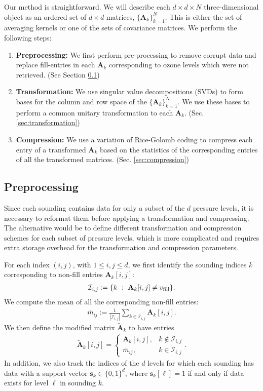 \documentclass{article}
\begin{document}
Our method is straightforward. We will describe each $d \times d \times N$ three-dimensional object as an ordered set of $d \times d$ matrices, $\{\mathbf{A}_k\}_{k = 1}^N$. This is either the set of averaging kernels or one of the sets of covariance matrices. We perform the following steps: 
\begin{enumerate} 
\item \textbf{Preprocessing:} We first perform pre-processing to remove corrupt data and replace fill-entries in each $\mathbf{A}_k$ corresponding to ozone levels which were not retrieved. (See Section \ref{sec:preprocessing}) 
\item \textbf{Transformation:} We use singular value decompositions (SVDs) to form bases for the column and row space of the $\{\mathbf{A}_k\}_{k=1}^N$. We use these bases to perform a common unitary transformation to each $\mathbf{A}_k$. (Sec. \ref{sec:transformation}) 
\item \textbf{Compression:} We use a variation of Rice-Golomb coding to compress each entry of a transformed $\mathbf{A}_k$ based on the statistics of the corresponding entries of all the transformed matrices. (Sec. \ref{sec:compression}) 
\end{enumerate} 



\subsection{Preprocessing} 
\label{sec:preprocessing} 
Since each sounding contains data for only a subset of the $d$ pressure levels, it is necessary to reformat them before applying a transformation and compressing. The alternative would be to define different transformation and compression schemes for each subset of pressure levels, which is more complicated and requires extra storage overhead for the transformation and compression parameters. 

For each index $(i, j)$, with $1 \le i,j \le d$, we first identify the sounding indices $k$ corresponding to non-fill entries $\mathbf{A}_k[i, j]$: 
\begin{align} 
{\mathcal{I}}_{i,j} := \{k~:~\mathbf{A}_k[i, j] \ne v_{\rm fill}\}. 
\end{align} 
We compute the mean of all the corresponding non-fill entries: 
\begin{align} 
\overline{m}_{ij} := \frac{1}{|{\mathcal{I}}_{i,j}|} \sum_{k \in {\mathcal{I}}_{i,j}} {\mathbf{A}}_k[i, j]. 
\end{align} 
We then define the modified matrix ${\mathbf{\tilde{A}}}_k$ to have entries
\begin{align} 
{\mathbf{\tilde{A}}}_k[i, j] = \begin{cases} {\mathbf{A}}_k[i, j], & k \notin {\mathcal{I}}_{i, j} \\ \overline{m}_{ij}, & k \in {\mathcal{I}}_{i, j} \end{cases}. 
\end{align} 
In addition, we also track the indices of the $d$ levels for which each sounding has data with a support vector $\mathbf{s}_k \in \{0, 1\}^d$, where $\mathbf{s}_k[\ell] = 1$ if and only if data exists for level $\ell$ in sounding $k$. 
\end{document}

